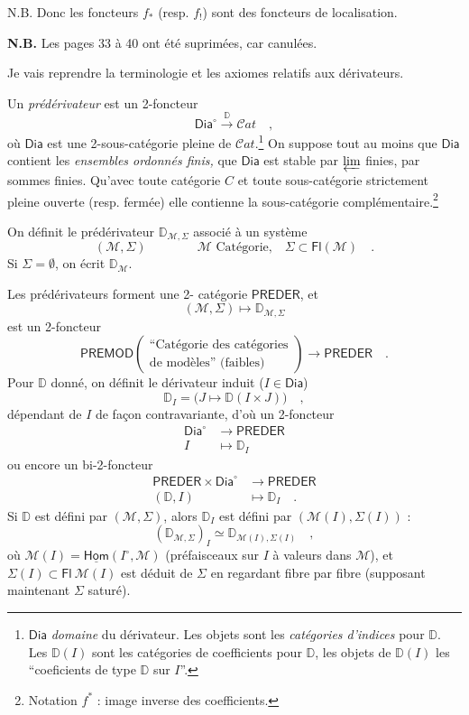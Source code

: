 \documentclass[11pt]{article}
\newcommand{\printedpage}[1]{\marginpar{\footnotesize p.~#1}}
\newcommand{\msp}[1]{\marginpar{\footnotesize [#1]}}
\newcommand{\sDia}{\mathsf{Dia}}
\newcommand{\DD}{\mathbb{D}}
\begin{document}
N.B. Donc les foncteurs $f_*$ (resp. $f_!$) sont des foncteurs de localisation.

\textbf{N.B.} Les pages 33 à 40 ont été suprimées, car canulées. %

\msp{page 41}
Je vais reprendre la terminologie et les axiomes relatifs aux dérivateurs.

Un \textit{prédérivateur} est un 2-foncteur
\[ \sDia^\circ \xrightarrow{\DD} \mathcal{C}at \quad , \]
où $\sDia$ est une 2-sous-catégorie pleine de $\mathcal{C}at$.\footnote[11]{$\sDia$ \textit{domaine} du dérivateur. Les objets sont les \textit{catégories d'indices} pour $\DD$. Les $\DD(I)$ sont les catégories de coefficients pour $\DD$, les objets de $\DD(I)$ les “coeficients de type $\DD$ sur $I$”. %
} On suppose tout au moins que $\sDia$ contient les \textit{ensembles ordonnés finis,} que $\sDia$ est stable par $\varprojlim$ finies, par sommes finies. Qu'avec toute catégorie $C$ et toute sous-catégorie strictement pleine ouverte (resp. fermée) elle contienne la sous-catégorie complémentaire.\footnote[12]{Notation $f^*$ : image inverse des coefficients.}

\printedpage{23}
\msp{page 42}
On définit le prédérivateur $\DD_{\mathcal{M},\Sigma}$ associé à un système
\[ (\mathcal{M},\Sigma) \qquad\qquad \mathcal{M} \text{ Catégorie,} \quad \Sigma \subset \mathsf{Fl}(\mathcal{M}) \quad . \] %
Si $\Sigma = \emptyset$, on écrit $\DD_{\mathcal{M}}$.

Les prédérivateurs forment une 2- catégorie $\mathsf{PREDER}$, et
\[ (\mathcal{M},\Sigma) \longmapsto \DD_{\mathcal{M},\Sigma} \]
est un 2-foncteur
\[ \mathsf{PREMOD}
\begin{pmatrix}
\text{“Catégorie des catégories} \\
\text{de modèles” (faibles)}
\end{pmatrix}
\longrightarrow \mathsf{PREDER} \quad . \]
Pour $\DD$ donné, on définit le dérivateur induit ($I \in \sDia$)
\[ \DD_I = \big(J \longmapsto \DD(I \times J)\big) \quad , \]
dépendant de $I$ de façon contravariante, d'où un 2-foncteur
\[ \begin{aligned}
\sDia^\circ &\longrightarrow \mathsf{PREDER} \\
I &\longmapsto \DD_I
\end{aligned} \]
ou encore un bi-2-foncteur
\[ \begin{aligned}
\mathsf{PREDER} \times \sDia^\circ &\longrightarrow \mathsf{PREDER} \\
(\DD, I) &\longmapsto \DD_I \quad .
\end{aligned} \]
Si $\DD$ est défini par $(\mathcal{M},\Sigma)$, alors $\DD_I$ est défini par $(\mathcal{M}(I),\Sigma(I))$ :
\[ (\DD_{\mathcal{M},\Sigma})_I \simeq \DD_{\mathcal{M}(I),\Sigma(I)} \quad , \]
\msp{page 43}
où $\mathcal{M}(I) = \underline{\mathsf{Hom}}(I^\circ,\mathcal{M})$ (préfaisceaux sur $I$ à valeurs dans $\mathcal{M}$), et $\Sigma(I) \subset \mathsf{Fl}\ \mathcal{M}(I)$ est déduit de $\Sigma$ en regardant fibre par fibre (supposant maintenant $\Sigma$ saturé). %
\end{document}
